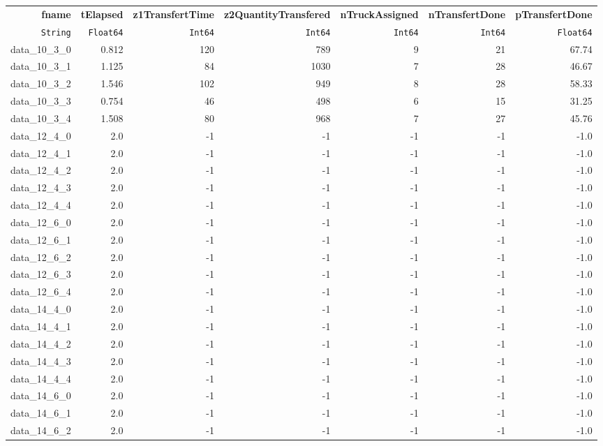 \begin{tabular}{rrrrrrr}
  \hline
  \textbf{fname} & \textbf{tElapsed} & \textbf{z1TransfertTime} & \textbf{z2QuantityTransfered} & \textbf{nTruckAssigned} & \textbf{nTransfertDone} & \textbf{pTransfertDone} \\
  \texttt{String} & \texttt{Float64} & \texttt{Int64} & \texttt{Int64} & \texttt{Int64} & \texttt{Int64} & \texttt{Float64} \\\hline
  data\_10\_3\_0 & 0.812 & 120 & 789 & 9 & 21 & 67.74 \\
  data\_10\_3\_1 & 1.125 & 84 & 1030 & 7 & 28 & 46.67 \\
  data\_10\_3\_2 & 1.546 & 102 & 949 & 8 & 28 & 58.33 \\
  data\_10\_3\_3 & 0.754 & 46 & 498 & 6 & 15 & 31.25 \\
  data\_10\_3\_4 & 1.508 & 80 & 968 & 7 & 27 & 45.76 \\
  data\_12\_4\_0 & 2.0 & -1 & -1 & -1 & -1 & -1.0 \\
  data\_12\_4\_1 & 2.0 & -1 & -1 & -1 & -1 & -1.0 \\
  data\_12\_4\_2 & 2.0 & -1 & -1 & -1 & -1 & -1.0 \\
  data\_12\_4\_3 & 2.0 & -1 & -1 & -1 & -1 & -1.0 \\
  data\_12\_4\_4 & 2.0 & -1 & -1 & -1 & -1 & -1.0 \\
  data\_12\_6\_0 & 2.0 & -1 & -1 & -1 & -1 & -1.0 \\
  data\_12\_6\_1 & 2.0 & -1 & -1 & -1 & -1 & -1.0 \\
  data\_12\_6\_2 & 2.0 & -1 & -1 & -1 & -1 & -1.0 \\
  data\_12\_6\_3 & 2.0 & -1 & -1 & -1 & -1 & -1.0 \\
  data\_12\_6\_4 & 2.0 & -1 & -1 & -1 & -1 & -1.0 \\
  data\_14\_4\_0 & 2.0 & -1 & -1 & -1 & -1 & -1.0 \\
  data\_14\_4\_1 & 2.0 & -1 & -1 & -1 & -1 & -1.0 \\
  data\_14\_4\_2 & 2.0 & -1 & -1 & -1 & -1 & -1.0 \\
  data\_14\_4\_3 & 2.0 & -1 & -1 & -1 & -1 & -1.0 \\
  data\_14\_4\_4 & 2.0 & -1 & -1 & -1 & -1 & -1.0 \\
  data\_14\_6\_0 & 2.0 & -1 & -1 & -1 & -1 & -1.0 \\
  data\_14\_6\_1 & 2.0 & -1 & -1 & -1 & -1 & -1.0 \\
  data\_14\_6\_2 & 2.0 & -1 & -1 & -1 & -1 & -1.0 \\

\end{tabular}
